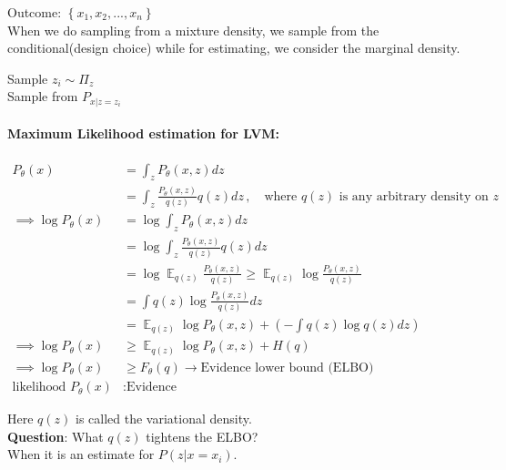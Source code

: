 \documentclass[11pt]{article}
\DeclareMathOperator*{\E}{\mathbb{E}}
\begin{document}
Outcome: $\left\{ x_1, x_2, ..., x_n \right\}$ \\

When we do sampling from a mixture density, we sample from the conditional(design choice) while for estimating, we consider the marginal density. \\

\begin{minipage}{0.45\textwidth}
  \begin{framed}
    \centering
    Sample $z_i \sim \Pi_z$ \\
    Sample from $P_{x|z = z_i}$ \\
  \end{framed}
\end{minipage}

\clearpage
\paragraph{Maximum Likelihood estimation  for LVM:}

\begin{align*}
  P_{\theta}(x) &= \int_z P_{\theta}(x, z) dz \\
                &= \int_z \frac{P_{\theta}(x, z)}{q(z)}q(z) dz\,, \quad\text{where $q(z)$ is any arbitrary density on $z$} \\
  \implies \log P_{\theta}(x) &= \log \int_z P_{\theta}(x, z) dz \\
                &= \log\int_z \frac{P_{\theta}(x, z)}{q(z)}q(z) dz \\
                &= \log \E_{q(z)} \frac{P_{\theta}(x,z)}{q(z)}
                  \geq \E_{q(z)} \log \frac{P_{\theta}(x, z)}{q(z)} \\
                &= \int q(z) \log \frac{P_{\theta}(x, z)}{q(z)} dz \\
                &= \E_{q(z)}\log P_{\theta}(x, z) + \left( -\int q(z) \log q(z)dz \right) \\
  \implies \log P_{\theta}(x) &\geq \E_{q(z)}\log P_{\theta}(x, z) + H(q) \\
  \implies \log P_{\theta}(x) &\geq F_{\theta}(q) \rightarrow \text{Evidence lower bound (ELBO)} \\
  \text{likelihood } P_{\theta}(x) &: \text{Evidence}
\end{align*}

Here $q(z)$ is called the variational density. \\
\textbf{Question}: What $q(z)$ tightens the ELBO? \\
When it is an estimate for $P(z|x=x_i)$.
\end{document}
